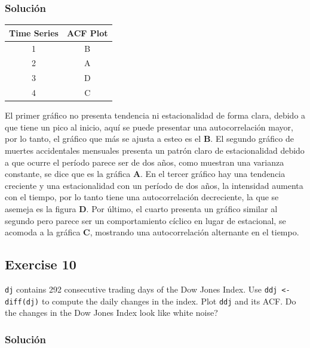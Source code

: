 \documentclass[12pt]{article}\usepackage[]{graphicx}\usepackage[]{xcolor}
\begin{document}
\subsubsection{Solución}


\begin{table}[h]
  \centering
  \begin{tabular}{|c|c|}
    \hline
    \textbf{Time Series}& \textbf{ACF Plot} \\ \hline
    1 & B \\ \hline
    2 & A \\ \hline
    3 & D \\ \hline
    4 & C \\ \hline
  \end{tabular}
\end{table}


El primer gráfico no presenta tendencia ni estacionalidad de forma clara, debido a que tiene un pico al inicio, aquí se puede presentar una autocorrelación mayor, por lo tanto, el gráfico que más se ajusta a esteo es el \textbf{B}. El segundo gráfico de muertes accidentales mensuales presenta un patrón claro de estacionalidad debido a que ocurre el período parece ser de dos años, como muestran una varianza constante, se dice que es la gráfica \textbf{A}. En el tercer gráfico hay una tendencia creciente y una estacionalidad con un período de dos años, la intensidad aumenta con el tiempo, por lo tanto tiene una autocorrelación decreciente, la que se asemeja es la figura \textbf{D}. Por último, el cuarto presenta un gráfico similar al segundo pero parece ser un comportamiento cíclico en lugar de estacional, se acomoda a la gráfica \textbf{C}, mostrando una autocorrelación alternante en el tiempo.


\subsection{Exercise 10}

\lstinline|dj| contains 292 consecutive trading days of the Dow Jones Index. Use \lstinline|ddj <- diff(dj)| to compute the daily changes in the index. Plot \lstinline|ddj| and its ACF. Do the changes in the Dow Jones Index look like white noise?



\subsubsection{Solución}
\end{document}
